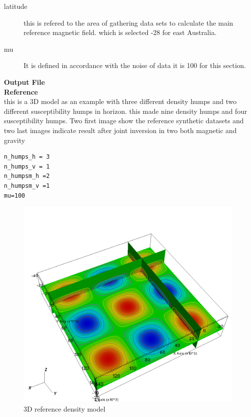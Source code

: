 \begin{description} 	
\item[latitude]this is refered to the area of gathering data sets to calculate the main reference magnetic field. which is selected -28 for east Australia.


\item[mu]It is defined in accordance with the noise of data it is 100 for this section.

\end{description}

\textbf{Output File}\\


\textbf{Reference}\\

this is a 3D model as an example with three different density humps and two different susceptibility humps in horizon. this made nine density humps and four susceptibility humps. Two first image show the reference synthetic datasets and two last images indicate result after joint inversion in two both magnetic and gravity 
 
\begin{verbatim}
n_humps_h = 3
n_humps_v = 1
n_humpsm_h =2
n_humpsm_v =1
mu=100
\end{verbatim}

\begin{figure}
\centering
\includegraphics[width=\textwidth]{joint3D4mag6grav-gref.png}
\caption{3D reference density model}

\end{figure}



